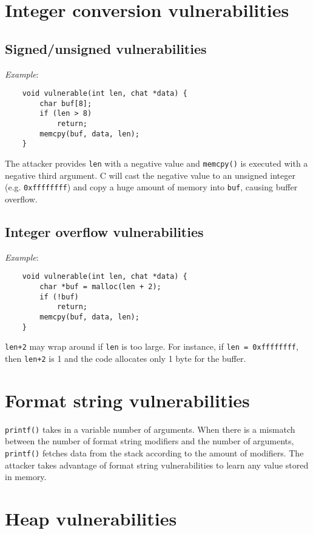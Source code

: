 \section{Integer conversion vulnerabilities}

\subsection{Signed/unsigned vulnerabilities}

\emph{Example}:

\begin{verbatim}
    void vulnerable(int len, chat *data) {
        char buf[8];
        if (len > 8)
            return;
        memcpy(buf, data, len);
    }
\end{verbatim}

The attacker provides \texttt{len} with a negative value and \texttt{memcpy()} is executed with a negative third argument. C will cast the negative value to an unsigned integer (e.g. \texttt{0xffffffff}) and copy a huge amount of memory into \texttt{buf}, causing buffer overflow.

\subsection{Integer overflow vulnerabilities}

\emph{Example}:

\begin{verbatim}
    void vulnerable(int len, chat *data) {
        char *buf = malloc(len + 2);
        if (!buf)
            return;
        memcpy(buf, data, len);
    }
\end{verbatim}

\texttt{len+2} may wrap around if \texttt{len} is too large. For instance, if \texttt{len = 0xffffffff}, then \texttt{len+2} is 1 and the code allocates only 1 byte for the buffer.

\section{Format string vulnerabilities}
\texttt{printf()} takes in a variable number of arguments. When there is a mismatch between the number of format string modifiers and the number of arguments, \texttt{printf()} fetches data from the stack according to the amount of modifiers. The attacker takes advantage of format string vulnerabilities to learn any value stored in memory.

\section{Heap vulnerabilities}


